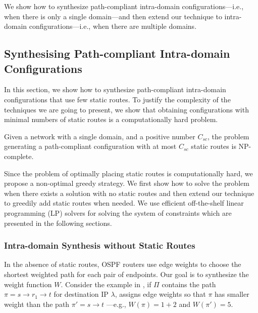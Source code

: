 We show how to synthesize 
path-compliant intra-domain 
configurations---i.e., when there
is only a single domain---and then extend our technique to
 intra-domain configurations---i.e., when
there are multiple domains.

\subsection{Synthesising Path-compliant Intra-domain Configurations} \label{sec:intra-synthesis}
In this section, we show how to synthesize  path-compliant  intra-domain configurations that
use few static routes.
To justify the complexity of the techniques 
we are going to present,
we show that
obtaining configurations with minimal numbers of static routes is a 
computationally hard problem.
\begin{theorem}
\label{thm:ospfsynth}
Given a
network with a single domain,
and a positive number $C_{sc}$,
the problem generating
a path-compliant configuration with at most $C_{sc}$ static routes
is NP-complete.
\end{theorem}
\iffull

\fi
Since the problem of optimally placing 
static routes is computationally hard, 
we propose a non-optimal greedy strategy.
We first show how to solve the problem when 
there exists a solution with no static routes
and then extend our technique to greedily 
add static routes when needed. We use 
efficient off-the-shelf linear programming (LP) 
solvers for solving the system of constraints 
which are presented in the following sections. 
			
\subsubsection{Intra-domain Synthesis without Static Routes} \label{sec:ospf}
 
In the absence of static routes,
 OSPF routers use edge weights
 to choose the
 shortest weighted path for each pair of endpoints. 
Our goal is to synthesize the weight function $W$.
Consider the example in , 
if $\Pi$ contains the 
 path $\pi=s\rightarrow r_1 \rightarrow t$ for
 destination IP $\lambda$, \name assigns
 edge weights so that $\pi$ has
 smaller weight than the path $\pi'=s \rightarrow t$ ---e.g., $W(\pi)=1+2$
  and $W(\pi')=5$. 
 
